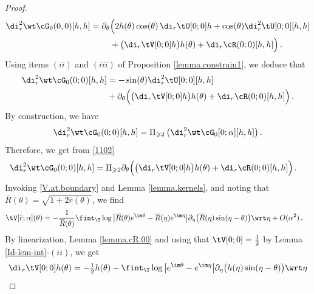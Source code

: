 \documentclass[a4paper,reqno,10pt]{article}
\newcommand{\pa}{\partial}
\begin{document}
\begin{proof}
\begin{align*}
	\di_{r}^2 \wt\cG_{0}(0,0)[h,h]= \pa_{\theta} &\Big(  2 h(\theta)\cos(\theta) \, \di_{r}\tU[0;0]h +\cos(\theta)\di_{r}^2\tU[0;0][h,h]  \\
	&+ \big(\di_{r}\tV[0;0]h\big) h(\theta) + \di_{r}\cR(0;0)[h,h] \Big) \,.
\end{align*}
  Using items $(ii)$ and $(iii)$ of Proposition  \ref{lemma.constrain1}, we deduce that
    \begin{align}\label{1102}
		\di_{r}^2 \wt\cG_{0}(0;0)[h,h]& =-\sin(\theta)\di_{r}^2\tU[0;0][h,h]\\
        &+\pa_{\theta} \Big(  \big(\di_{r}\tV[0;0]h\big) h(\theta) + \di_{r}\cR(0;0)[h,h]  \Big)\,.
	\end{align}
    By construction, we have
    $$
    \di_{r}^2 \wt\cG_{0}(0;0)[h,h]=\Pi_{\geqslant2}\left(\di_{r}^2 \wt\cG_{0}[0;\alpha][h,h]\right).
    $$
    Therefore, we get from \eqref{1102}
    \begin{align}\label{112}
		\di_{r}^2 \wt\cG_{0}(0;0)[h,h]
        &=\Pi_{\geqslant2}\pa_{\theta} \Big(  \big(\di_{r}\tV[0;0]h\big) h(\theta) + \di_{r}\cR(0;0)[h,h]  \Big)\,.
	\end{align}
   Invoking \eqref{V.at.boundary} and Lemma \ref{lemma.kernels}, and noting  that $\overline R(\theta)= \sqrt{1+2\overline r(\theta)}$, we find
	\begin{align*}
			\nonumber \tV[\overline r;\alpha](\theta) = - \frac{1}{ \overline R(\theta) } &\fint_{\T} \log\big|\overline R(\theta) e^{\im\theta}- \overline R(\eta)e^{\im\eta} \big| \pa_{\eta} \big( \overline R(\eta) \sin(\eta-\theta) \big) \wrt\eta + O(\alpha^2) \,.
		\end{align*}
    By linearization, Lemma \ref{lemma.cR.00} and using that $ \tV[0;0]=\frac12$ by Lemma \ref{Id-lem-int}-$(ii)$,  we get
		\begin{equation}\label{pula1}
			\begin{aligned}
					\di_{r}\tV[0;0]h(\theta) &=- \tfrac12 h(\theta) -  \fint_{\T} \log\big| e^{\im\theta}- e^{\im\eta} \big| \pa_{\eta} \big( h(\eta) \sin(\eta-\theta) \big) \wrt\eta  \\

\end{aligned}
\end{equation}
\end{proof}
\end{document}
